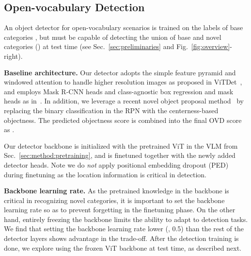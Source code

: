 \documentclass[10pt,twocolumn,letterpaper]{article}
\newcommand{\figref}[1]{Fig.~\ref{#1}}
\newcommand{\secref}[1]{Sec.~\ref{#1}}
\renewcommand{\paragraph}[1]{\vspace{1mm}\noindent\textbf{#1}}
\begin{document}
\subsection{Open-vocabulary Detection}
\label{sec:method:ovd}
An object detector for open-vocabulary scenarios is trained on the labels of base categories , but must be capable of detecting the union of base and novel categories () at test time (see \secref{sec:preliminaries} and \figref{fig:overview}-right).


\paragraph{Baseline architecture.}\quad
Our detector adopts the simple feature pyramid and windowed attention to handle higher resolution images as proposed in ViTDet~\cite{li2022exploring}, and employs Mask R-CNN heads and class-agnostic box regression and mask heads as in~\cite{du2022learning,gu2022openvocabulary,Zareian_2021_CVPR,zhong2021regionclip,kuo2022f}. In addition, we leverage a recent novel object proposal method~\cite{kim2022learning} by replacing the binary classification in the RPN with the centerness-based objectness. The predicted objectness score  is combined into the final OVD score as .

Our detector backbone is initialized with the pretrained ViT in the VLM from \secref{sec:method:pretraining}, and is finetuned together with the newly added detector heads. Note we do \textit{not} apply positional embedding dropout (PED) during finetuning as the location information is critical in detection.

\paragraph{Backbone learning rate.}\quad
As the pretrained knowledge in the backbone is critical in recognizing novel categories, it is important to set the backbone learning rate so as to prevent forgetting in the finetuning phase. On the other hand, entirely freezing the backbone limits the ability to adapt to detection tasks. We find that setting the backbone learning rate lower (\eg, 0.5) than the rest of the detector layers shows advantage in the trade-off. After the detection training is done, we explore using the frozen ViT backbone at test time, as described next.
\end{document}
